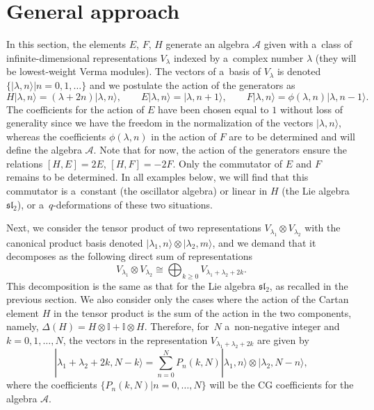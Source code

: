 \documentclass[10pt,a4paper]{amsart}
\numberwithin{equation}{section}
\theoremstyle{definition}
\begin{document}
\section{General approach }\label{sec:GA}

In this section, the elements $E$, $F$, $H$
generate an algebra $\mathcal{A}$ given with a~class of infinite-dimensional representations $V_\lambda$ indexed by a~complex number $\lambda$ (they will be lowest-weight Verma modules). The vectors of a~basis of $V_\lambda$ is denoted $\{|\lambda,n\rangle | n=0,1,\dots\}$ and we postulate the action of the generators as
\[H|\lambda,n\rangle=(\lambda+2n)|\lambda,n\rangle, \qquad E|\lambda,n\rangle=|\lambda,n+1\rangle, \qquad F|\lambda,n\rangle=\phi(\lambda,n)|\lambda,n-1\rangle.\]
The coefficients for the action of $E$ have been chosen equal to $1$ without loss of generality since we have the freedom in the normalization of the vectors $|\lambda,n\rangle$, whereas
the coefficients $\phi(\lambda,n)$ in the action of $F$ are to be determined and will define the algebra $\mathcal{A}$. Note that for now, the action of the generators ensure the relations
$[H,E]=2E$, $ [H,F]=-2F$.
Only the commutator of $E$ and $F$ remains to be determined. In all examples below, we will find that this commutator is a~constant (the oscillator algebra) or linear in $H$ (the Lie algebra $\mathfrak{sl}_2$), or a~$q$-deformations of these two situations.

Next, we consider the tensor product of two representations
$V_{\lambda_1}\otimes V_{\lambda_2}$
with the canonical product basis denoted $|\lambda_1,n\rangle\otimes |\lambda_2,m\rangle$, and we demand that
it decomposes as the following direct sum of representations
\[V_{\lambda_1}\otimes V_{\lambda_2}\cong\bigoplus_{k\geq 0} V_{\lambda_1+\lambda_2+2k}.\]
This decomposition is the same as that for the Lie algebra $\mathfrak{sl}_2$, as recalled in the previous section.
We also consider only the cases where the action of the Cartan element $H$ in the tensor product is the sum of the action in the two components, namely, $\Delta(H)=H\otimes \mathbb{I}+\mathbb{I}\otimes H$.
Therefore, for~$N$ a~non-negative integer and $k=0,1,\dots,N$, the vectors in the representation $V_{\lambda_1+\lambda_2+2k}$ are given by
\begin{equation}\label{CG-relation}
|\lambda_1+\lambda_2+2k,N-k\rangle=\sum_{n=0}^N P_n(k,N)|\lambda_1,n\rangle\otimes |\lambda_2,N-n\rangle,
\end{equation}
where the coefficients $\{P_n(k,N) | n=0,\dots,N\}$ will be the CG coefficients for the algebra $\mathcal{A}$.
\end{document}
